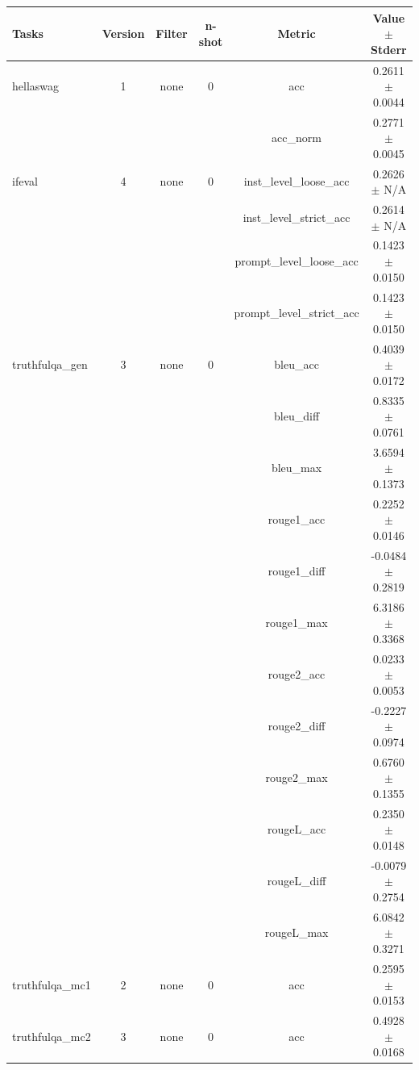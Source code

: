 \documentclass{ifacconf}
\begin{document}
\vfill
\clearpage
\pagebreak

\begin{strip}
\begin{minipage}{\textwidth}
\begin{table}[H]
    \centering
    \begin{tabular}{|l|c|c|c|c|c|}
    \hline
    \textbf{Tasks} & \textbf{Version} & \textbf{Filter} & \textbf{n-shot} & \textbf{Metric} & \textbf{Value} $\pm$ \textbf{Stderr} \\ \hline
    hellaswag & 1 & none & 0 & acc & 0.2611 $\pm$ 0.0044 \\ \hline
    & & & & acc\_norm & 0.2771 $\pm$ 0.0045 \\ \hline
    ifeval & 4 & none & 0 & inst\_level\_loose\_acc & 0.2626 $\pm$ N/A \\ \hline
    & & & & inst\_level\_strict\_acc & 0.2614 $\pm$ N/A \\ \hline
    & & & & prompt\_level\_loose\_acc & 0.1423 $\pm$ 0.0150 \\ \hline
    & & & & prompt\_level\_strict\_acc & 0.1423 $\pm$ 0.0150 \\ \hline
    truthfulqa\_gen & 3 & none & 0 & bleu\_acc & 0.4039 $\pm$ 0.0172 \\ \hline
    & & & & bleu\_diff & 0.8335 $\pm$ 0.0761 \\ \hline
    & & & & bleu\_max & 3.6594 $\pm$ 0.1373 \\ \hline
    & & & & rouge1\_acc & 0.2252 $\pm$ 0.0146 \\ \hline
    & & & & rouge1\_diff & -0.0484 $\pm$ 0.2819 \\ \hline
    & & & & rouge1\_max & 6.3186 $\pm$ 0.3368 \\ \hline
    & & & & rouge2\_acc & 0.0233 $\pm$ 0.0053 \\ \hline
    & & & & rouge2\_diff & -0.2227 $\pm$ 0.0974 \\ \hline
    & & & & rouge2\_max & 0.6760 $\pm$ 0.1355 \\ \hline
    & & & & rougeL\_acc & 0.2350 $\pm$ 0.0148 \\ \hline
    & & & & rougeL\_diff & -0.0079 $\pm$ 0.2754 \\ \hline
    & & & & rougeL\_max & 6.0842 $\pm$ 0.3271 \\ \hline
    truthfulqa\_mc1 & 2 & none & 0 & acc & 0.2595 $\pm$ 0.0153 \\ \hline
    truthfulqa\_mc2 & 3 & none & 0 & acc & 0.4928 $\pm$ 0.0168 \\ \hline
    \end{tabular}
    \label{tab:qwen25_q6k}
    \end{table}


\end{minipage}
\end{strip}
\end{document}
